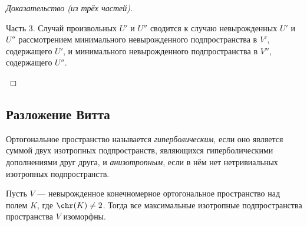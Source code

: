 \documentclass[
	extrafontsizes,
	11pt,
	hyphens,
]{memoir}
\begin{document}
\begin{proof}[Доказательство (из трёх частей)]
\begin{proofdescription}
\item[Часть 3.]
Случай произвольных \(U'\) и \(U''\) сводится к случаю невырожденных \(U'\) и \(U''\) рассмотрением
минимального невырожденного подпространства в \(V'\), содержащего \(U'\), и
минимального невырожденного подпространства в \(V''\), содержащего \(U''\).
\qedhere

\end{proofdescription}
\end{proof}

\subsection{Разложение Витта}

\begin{definition}
Ортогональное пространство
называется \emph{гиперболическим}, если оно является суммой двух изотропных подпространств, являющихся гиперболическими дополнениями друг друга,
и \emph{анизотропным}, если в нём нет нетривиальных изотропных подпространств.
\end{definition}



\begin{lemma}%
\label{lem:max_isot_iso}
Пусть \(V\) --- невырожденное конечномерное ортогональное пространство над полем \(K\), где \(\chr(K) \neq 2\).
Тогда все максимальные изотропные подпространства пространства \(V\) изоморфны.
\end{lemma}
\end{document}
